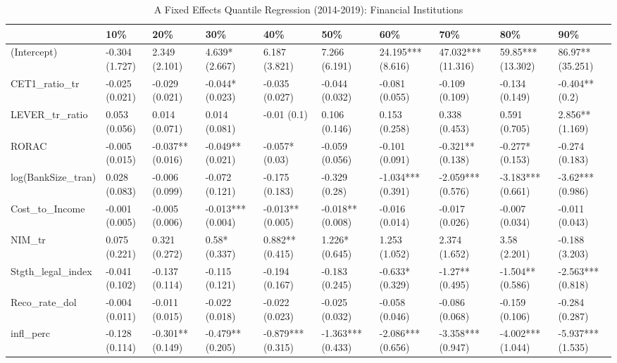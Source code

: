 \begin{table}[ht]
\centering
\caption{A Fixed Effects Quantile Regression (2014-2019): Financial Institutions} 
\begingroup\small
\begin{tabular}{llllllllll}
  \toprule
 & 10\% & 20\% & 30\% & 40\% & 50\% & 60\% & 70\% & 80\% & 90\% \\ 
  \midrule
(Intercept) & -0.304 (1.727) & 2.349 (2.101) & 4.639* (2.667) & 6.187 (3.821) & 7.266 (6.191) & 24.195*** (8.616) & 47.032*** (11.316) & 59.85*** (13.302) & 86.97** (35.251) \\ 
  CET1\_ratio\_tr & -0.025 (0.021) & -0.029 (0.021) & -0.044* (0.023) & -0.035 (0.027) & -0.044 (0.032) & -0.081 (0.055) & -0.109 (0.109) & -0.134 (0.149) & -0.404** (0.2) \\ 
  LEVER\_tr\_ratio & 0.053 (0.056) & 0.014 (0.071) & 0.014 (0.081) & -0.01 (0.1) & 0.106 (0.146) & 0.153 (0.258) & 0.338 (0.453) & 0.591 (0.705) & 2.856** (1.169) \\ 
  RORAC & -0.005 (0.015) & -0.037** (0.016) & -0.049** (0.021) & -0.057* (0.03) & -0.059 (0.056) & -0.101 (0.091) & -0.321** (0.138) & -0.277* (0.153) & -0.274 (0.183) \\ 
  log(BankSize\_tran) & 0.028 (0.083) & -0.006 (0.099) & -0.072 (0.121) & -0.175 (0.183) & -0.329 (0.28) & -1.034*** (0.391) & -2.059*** (0.576) & -3.183*** (0.661) & -3.62*** (0.986) \\ 
  Cost\_to\_Income & -0.001 (0.005) & -0.005 (0.006) & -0.013*** (0.004) & -0.013** (0.005) & -0.018** (0.008) & -0.016 (0.014) & -0.017 (0.026) & -0.007 (0.034) & -0.011 (0.043) \\ 
  NIM\_tr & 0.075 (0.221) & 0.321 (0.272) & 0.58* (0.337) & 0.882** (0.415) & 1.226* (0.645) & 1.253 (1.052) & 2.374 (1.652) & 3.58 (2.201) & -0.188 (3.203) \\ 
  Stgth\_legal\_index & -0.041 (0.102) & -0.137 (0.114) & -0.115 (0.121) & -0.194 (0.167) & -0.183 (0.245) & -0.633* (0.329) & -1.27** (0.495) & -1.504** (0.586) & -2.563*** (0.818) \\ 
  Reco\_rate\_dol & -0.004 (0.011) & -0.011 (0.015) & -0.022 (0.018) & -0.022 (0.023) & -0.025 (0.032) & -0.058 (0.046) & -0.086 (0.068) & -0.159 (0.106) & -0.284 (0.287) \\ 
  infl\_perc & -0.128 (0.114) & -0.301** (0.149) & -0.479** (0.205) & -0.879*** (0.315) & -1.363*** (0.433) & -2.086*** (0.656) & -3.358*** (0.947) & -4.002*** (1.044) & -5.937*** (1.535) \\ 

\end{tabular}
\end{table}

